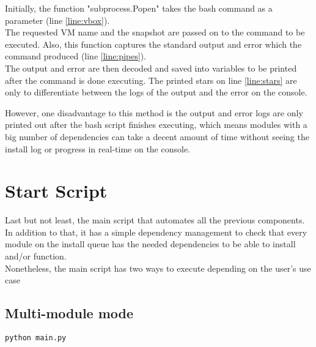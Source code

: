 Initially, the function "subprocess.Popen" takes the bash command as a parameter (line \ref{line:vbox}).\\
The requested VM name and the snapshot are passed on to the command to be executed.
Also, this function captures the standard output and error which the command produced (line \ref{line:pipes}).\\
The output and error are then decoded and saved into variables to be printed after the command is done executing. The printed stars on line \ref{line:stars} are only to differentiate between the logs of the output and the error on the console.


However, one disadvantage to this method is the output and error logs are only printed out after the bash script finishes executing, which means modules with a big number of dependencies can take a decent amount of time without seeing the install log or progress in real-time on the console.\\


\section{Start Script}
Last but not least, the main script that automates all the previous components.\\
In addition to that, it has a simple dependency management to check that every module on the install queue has the needed dependencies to be able to install and/or function.\\
Nonetheless, the main script has two ways to execute depending on the user’s use case

\subsection{Multi-module mode}
\begin{lstlisting}[caption=Multi-module command, style=pythonstyle]
python main.py
\end{lstlisting}

